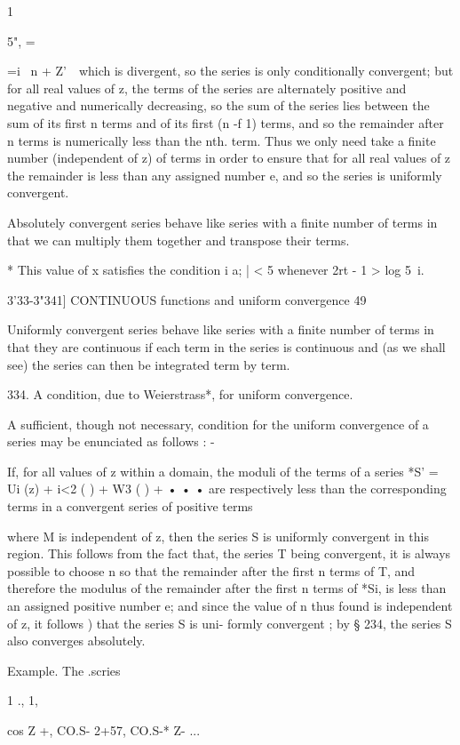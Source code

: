 1

5", =

 =i \ n + Z'\ \ which is divergent, so the series is only
conditionally convergent; but for all real values of z, the terms of
the series are alternately positive and negative and numerically
decreasing, so the sum of the series lies between the sum of its first
n terms and of its first (n -f 1) terms, and so the remainder after n
terms is numerically less than the nth. term. Thus we only need take a
finite number (independent of z) of terms in order to ensure that for
all real values of z the remainder is less than any assigned number e,
and so the series is uniformly convergent.

Absolutely convergent series behave like series with a finite number
of terms in that we can multiply them together and transpose their
terms.

* This value of x satisfies the condition i a; | < 5 whenever 2rt - 1
> log 5~i.

3'33-3"341] CONTINUOUS functions and uniform convergence 49

Uniformly convergent series behave like series with a finite number of
terms in that they are continuous if each term in the series is
continuous and (as we shall see) the series can then be integrated
term by term.

334. A condition, due to Weierstrass*, for uniform convergence.

A sufficient, though not necessary, condition for the uniform
convergence of a series may be enunciated as follows : -

If, for all values of z within a domain, the moduli of the terms of a
series *S' = Ui (z) + i<2 ( ) + W3 ( ) + • • • are respectively less
than the corresponding terms in a convergent series of positive terms

where M is independent of z, then the series S is uniformly convergent
in this region. This follows from the fact that, the series T being
convergent, it is always possible to choose n so that the remainder
after the first n terms of T, and therefore the modulus of the
remainder after the first n terms of *Si, is less than an assigned
positive number e; and since the value of n thus found is independent
of z, it follows ) that the series S is uni- formly convergent
; by § 234, the series S also converges absolutely.

Example. The .scries

1 ., 1,

cos Z +, CO.S- 2+57, CO.S-* Z- ...


